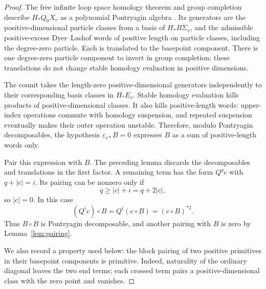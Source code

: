 \begin{proof}
The free infinite loop space homology theorem and group completion
describe $H_*Q_0X_v$ as a polynomial Pontryagin algebra
\cite[Part I]{CLM1976}.  Its generators are the positive-dimensional
particle classes from a basis of $H_*B\Sigma_v$, and the admissible
positive-excess Dyer--Lashof words of positive length on particle
classes, including the degree-zero particle.  Each is translated to
the basepoint component.  There is one degree-zero particle component
to invert in group completion; these translations do not change
stable homology evaluation in positive dimensions.

The counit takes the length-zero positive-dimensional generators
independently to their corresponding basis classes in $H_*E_v$.
Stable homology evaluation kills products of positive-dimensional classes.
It also kills positive-length words: upper-index operations commute with
homology suspension, and repeated suspension eventually makes their
outer operation unstable.  Therefore, modulo Pontryagin decomposables,
the hypothesis $\varepsilon_{v*}B=0$ expresses $B$ as a sum of
positive-length words only.

Pair this expression with $B$.  The preceding lemma discards the
decomposables and translations in the first factor.  A remaining term
has the form $Q^q c$ with $q+|c|=i$.  Its pairing can be nonzero only if
\[
 q\geq |c|+i=q+2|c|,
\]
so $|c|=0$.  In this case
\[
 (Q^i c)\circ B=Q^i(c\circ B)=(c\circ B)^{*2}.
\]
Thus $B\circ B$ is Pontryagin decomposable, and another pairing with
$B$ is zero by Lemma~\ref{lem:pairing}.

We also record a property used below: the block pairing of two
positive primitives in their basepoint components is primitive.
Indeed, naturality of the ordinary diagonal leaves the two end terms;
each crossed term pairs a positive-dimensional class with the zero
point and vanishes.
\end{proof}

